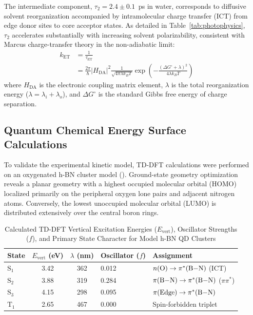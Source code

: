 \documentclass[journal=jpcbfk,manuscript=article,layout=twocolumn]{achemso}
\begin{document}
The intermediate component, $\tau_2 = 2.4 \pm 0.1$~ps in water, corresponds to diffusive solvent reorganization accompanied by intramolecular charge transfer (ICT) from edge donor sites to core acceptor states. As detailed in Table~\ref{tab:photophysics}, $\tau_2$ accelerates substantially with increasing solvent polarizability, consistent with Marcus charge-transfer theory in the non-adiabatic limit:
\begin{equation}
\begin{aligned}
k_{\text{ET}} &= \frac{1}{\tau_{\text{ET}}} \\
&= \frac{2\pi}{\hbar} |H_{\text{DA}}|^2 \frac{1}{\sqrt{4\pi \lambda k_B T}} \exp\left( -\frac{(\Delta G^\circ + \lambda)^2}{4\lambda k_B T} \right)
\end{aligned}
\label{eq:marcus}
\end{equation}
where $H_{\text{DA}}$ is the electronic coupling matrix element, $\lambda$ is the total reorganization energy ($\lambda = \lambda_i + \lambda_o$), and $\Delta G^\circ$ is the standard Gibbs free energy of charge separation.

\subsection{Quantum Chemical Energy Surface Calculations}

To validate the experimental kinetic model, TD-DFT calculations were performed on an oxygenated h-BN cluster model (). Ground-state geometry optimization reveals a planar geometry with a highest occupied molecular orbital (HOMO) localized primarily on the peripheral oxygen lone pairs and adjacent nitrogen atoms. Conversely, the lowest unoccupied molecular orbital (LUMO) is distributed extensively over the central boron rings.

\begin{table}[h]
\caption{Calculated TD-DFT Vertical Excitation Energies ($E_{\text{vert}}$), Oscillator Strengths ($f$), and Primary State Character for Model h-BN QD Clusters}
\label{tab:dft_results}
\centering
\footnotesize
\setlength{\tabcolsep}{3pt}
\begin{tabular}{lccll}
\toprule
State & $E_{\text{vert}}$ (eV) & $\lambda$ (nm) & Oscillator ($f$) & Assignment \\
\midrule
$\text{S}_1$ & 3.42 & 362 & 0.012 & $n(\text{O}) \to \pi^*(\ce{B-N})$ (ICT) \\
$\text{S}_2$ & 3.88 & 319 & 0.284 & $\pi(\ce{B-N}) \to \pi^*(\ce{B-N})$ ($\pi \pi^*$) \\
$\text{S}_3$ & 4.15 & 298 & 0.095 & $\pi(\text{Edge}) \to \pi^*(\ce{B-N})$ \\
$\text{T}_1$ & 2.65 & 467 & 0.000 & Spin-forbidden triplet \\
\bottomrule
\end{tabular}
\end{table}
\end{document}
